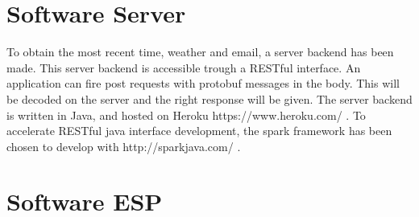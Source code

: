 \section{Software Server}
To obtain the most recent time, weather and email, a server backend has been made. This server backend is accessible trough a RESTful interface. An application can fire post requests with protobuf messages in the body. This will be decoded on the server and the right response will be given. The server backend is written in Java, and hosted on Heroku https://www.heroku.com/ . To accelerate RESTful java interface development, the spark framework has been chosen to develop with http://sparkjava.com/ .
\section{Software ESP}

